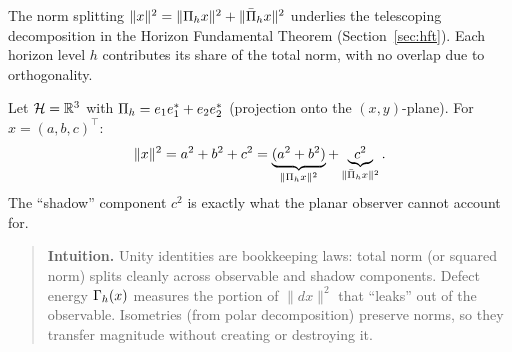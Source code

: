 \begin{remark}
The norm splitting $\|x\|^2 = \|\Pi_{h} x\|^2 + \|\bar{\Pi}_{h} x\|^2$ underlies the telescoping decomposition in the Horizon Fundamental Theorem (Section~\ref{sec:hft}).
Each horizon level $h$ contributes its share of the total norm, with no overlap due to orthogonality.
\end{remark}

\begin{example}
\label{ex:norm-r3}
Let $\mathcal{H} = \mathbb{R}^3$ with $\Pi_{h} = e_1 e_1^* + e_2 e_2^*$ (projection onto the $(x,y)$-plane).
For $x = (a, b, c)^\top$:
\[
\|x\|^2 = a^2 + b^2 + c^2 = \underbrace{(a^2 + b^2)}_{\|\Pi_{h} x\|^2} + \underbrace{c^2}_{\|\bar{\Pi}_{h} x\|^2}.
\]
The ``shadow'' component $c^2$ is exactly what the planar observer cannot account for.
\end{example}

\begin{quote}\small
\textbf{Intuition.}
Unity identities are bookkeeping laws: total norm (or squared norm) splits cleanly across observable and shadow components.
Defect energy $\Gamma_{h}(x)$ measures the portion of $\|dx\|^2$ that ``leaks'' out of the observable.
Isometries (from polar decomposition) preserve norms, so they transfer magnitude without creating or destroying it.
\end{quote}
